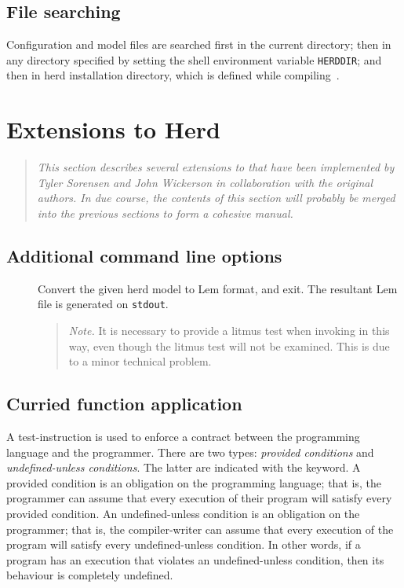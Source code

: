 \subsection{\label{herd:searchpath}File searching}
Configuration and model files are searched first in the current directory;
then in any directory specified
by setting the shell environment variable \texttt{HERDDIR};
and then in herd installation directory, which is defined
while compiling~\herd.

\section{Extensions to Herd}

\begin{quote}\it
This section describes several extensions to \herd{} that have been implemented by Tyler Sorensen and John Wickerson in collaboration with the original authors. In due course, the contents of this section will probably be merged into the previous sections to form a cohesive manual.
\end{quote}

\subsection{Additional command line options}

\begin{description}
\item[{\tt {}}] Convert the given herd model to Lem format, and exit. The resultant Lem file is generated on {\tt stdout}. 
\begin{quote}\emph{Note.} It is necessary to provide a litmus test when invoking \herd{} in this way, even though the litmus test will not be examined. This is due to a minor technical problem.\end{quote}
\end{description}



\subsection{Curried function application}

A test-instruction is used to enforce a contract between the programming language and the programmer. There are two types: \emph{provided conditions} and \emph{undefined-unless conditions}. The latter are indicated with the  keyword. A provided condition is an obligation on the programming language; that is, the programmer can assume that every execution of their program will satisfy every provided condition. An undefined-unless condition is an obligation on the programmer; that is, the compiler-writer can assume that every execution of the program will satisfy every undefined-unless condition. In other words, if a program has an execution that violates an undefined-unless condition, then its behaviour is completely undefined.


